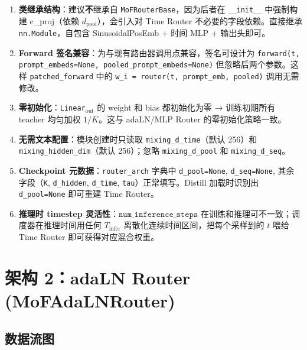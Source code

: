 \documentclass[11pt,a4paper]{article}
\begin{document}
\begin{enumerate}
    \item \textbf{类继承结构}：建议\textbf{不}继承自 \texttt{MoFRouterBase}，因为后者在 \texttt{\_\_init\_\_} 中强制构建 c\_proj（依赖 $d_{\text{pool}}$），会引入对 Time Router 不必要的字段依赖。直接继承 \texttt{nn.Module}，自包含 SinusoidalPosEmb + 时间 MLP + 输出头即可。
    \item \textbf{Forward 签名兼容}：为与现有路由器调用点兼容，签名可设计为 \texttt{forward(t, prompt\_embeds=None, pooled\_prompt\_embeds=None)} 但忽略后两个参数。这样 \texttt{patched\_forward} 中的 \texttt{w\_i = router(t, prompt\_emb, pooled)} 调用无需修改。
    \item \textbf{零初始化}：\texttt{Linear}$_{\text{out}}$ 的 weight 和 bias 都初始化为零 → 训练初期所有 teacher 均匀加权 $1/K$。这与 adaLN/MLP Router 的零初始化策略一致。
    \item \textbf{无需文本配置}：模块创建时只读取 \texttt{mixing\_d\_time}（默认 256）和 \texttt{mixing\_hidden\_dim}（默认 256）；忽略 \texttt{mixing\_d\_pool} 和 \texttt{mixing\_d\_seq}。
    \item \textbf{Checkpoint 元数据}：\texttt{router\_arch} 字典中 \texttt{d\_pool=None}, \texttt{d\_seq=None}, 其余字段（\texttt{K}, \texttt{d\_hidden}, \texttt{d\_time}, \texttt{tau}）正常填写。Distill 加载时识别出 \texttt{d\_pool=None} 即可重建 Time Router。
    \item \textbf{推理时 timestep 灵活性}：$\texttt{num\_inference\_steps}$ 在训练和推理可不一致；调度器在推理时间用任何 $T_{\text{infer}}$ 离散化连续时间区间，把每个采样到的 $t$ 喂给 Time Router 即可获得对应混合权重。
\end{enumerate}

\section{架构 2：adaLN Router (MoFAdaLNRouter)}

\subsection{数据流图}
\end{document}
